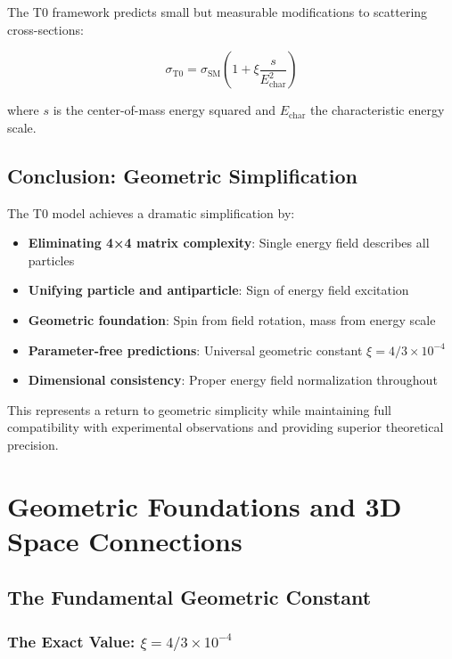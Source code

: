 \documentclass[12pt,a4paper]{report}
\begin{document}
The T0 framework predicts small but measurable modifications to scattering cross-sections:

\begin{equation}
	\sigma_{\text{T0}} = \sigma_{\text{SM}} \left(1 + \xi \frac{s}{E_{\text{char}}^2}\right)
\end{equation}

where $s$ is the center-of-mass energy squared and $E_{\text{char}}$ the characteristic energy scale.

\section{Conclusion: Geometric Simplification}
\label{sec:conclusion}

The T0 model achieves a dramatic simplification by:

\begin{itemize}
	\item \textbf{Eliminating 4×4 matrix complexity}: Single energy field describes all particles
	\item \textbf{Unifying particle and antiparticle}: Sign of energy field excitation
	\item \textbf{Geometric foundation}: Spin from field rotation, mass from energy scale
	\item \textbf{Parameter-free predictions}: Universal geometric constant $\xi = 4/3 \times 10^{-4}$
	\item \textbf{Dimensional consistency}: Proper energy field normalization throughout
\end{itemize}

This represents a return to geometric simplicity while maintaining full compatibility with experimental observations and providing superior theoretical precision.
	\chapter{Geometric Foundations and 3D Space Connections}
	\label{chap:geometric_foundations}
	
	\section{The Fundamental Geometric Constant}
	\label{sec:fundamental_geometric_constant}
	
	\subsection{The Exact Value: $\xi = 4/3 \times 10^{-4}$}
	\label{subsec:exact_value}
	
\end{document}
